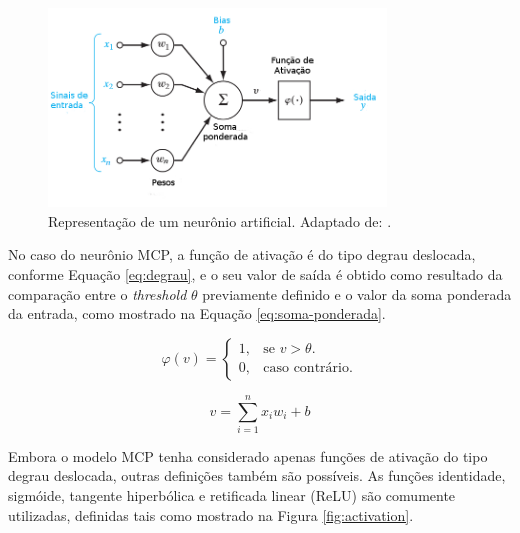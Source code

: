 \begin{figure}[H]
\centering
\caption{Representação de um neurônio artificial. Adaptado de: \cite{haykin}.}
\label{fig:neuronio-artificial}
\includegraphics[width=0.8\textwidth]{imgs/neuronio-artificial}
\end{figure}

No caso do neurônio MCP, a função de ativação é do tipo degrau deslocada, conforme Equação \ref{eq:degrau}, e o seu valor de saída é obtido como resultado da comparação entre o \emph{threshold} $\theta$ previamente definido e o valor da soma ponderada da entrada, como mostrado na Equação \ref{eq:soma-ponderada}.

\begin{equation}
\label{eq:degrau}
\varphi(v) = \left\{
\begin{array}{lr}
  1, & \text{se } v > \theta.\\
  0, & \text{caso contrário}.
\end{array}
\right.
\end{equation}

\begin{equation}
  \label{eq:soma-ponderada}
  v = \sum\limits_{i=1}^n x_i w_i + b
\end{equation}



Embora o modelo MCP tenha considerado apenas funções de ativação do tipo degrau deslocada, outras definições também são possíveis. As funções identidade, sigmóide, tangente hiperbólica e retificada linear (ReLU) são comumente utilizadas, definidas tais como mostrado na Figura \ref{fig:activation}.

